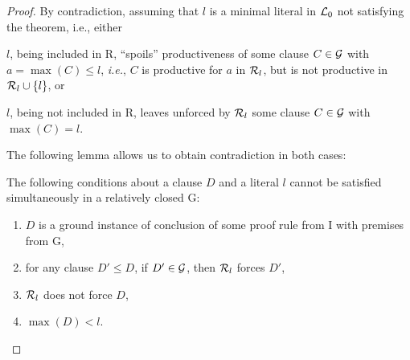 \begin{proof} By contradiction, assuming that $l$ is a minimal literal 
in \(\mbox {$\cal L$}_0\) not satisfying the theorem, i.e., either
\begin{description}\smallerspaces
\item[B1.] $l$, being included in \C R, ``spoils'' productiveness of some 
  clause \(C\in\mbox {$\cal G$}\) with \(a=\max (C) \leq l\), {\em i.e.}, $C$ is
  productive for $a$ in \(\mbox {$\cal R$}_l\), but is not productive in \(\mbox {$\cal R$}_l\cup\{l\}\), or
\item[B2.] $l$, being not included in \C R, leaves unforced by \(\mbox {$\cal R$}_l\) 
  some clause \(C\in\mbox {$\cal G$}\) with \(\max (C)=l\).
\end{description}
The following lemma allows us to obtain contradiction in both cases:

 \begin{lemma}\label {le:contradiction-way}
The following conditions about a clause $D$ and a literal $l$ cannot be 
satisfied simultaneously in a relatively closed \C G:
\begin{enumerate}
\item $D$ is a ground instance of conclusion of some proof rule
from \C I with premises from \C G,
\item for any clause \(D'\leq D\), if \(D'\in\mbox {$\cal G$}\), then \(\mbox {$\cal R$}_l\)
forces $D'$,
\item \(\mbox {$\cal R$}_l\) does not force $D$,
\item\(\max(D)<l\).
\end{enumerate}
 \end{lemma}


\end{proof}
